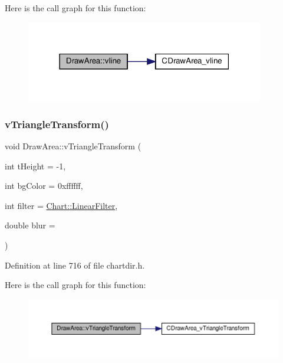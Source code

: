 Here is the call graph for this function\+:
\nopagebreak
\begin{figure}[H]
\begin{center}
\leavevmode
\includegraphics[width=295pt]{class_draw_area_ac679f2b836e67e68994b7977d4881383_cgraph}
\end{center}
\end{figure}
\mbox{\label{class_draw_area_a2de5a0565d3611d6730a70cfe0f2718f}} 
\subsubsection{\texorpdfstring{v\+Triangle\+Transform()}{vTriangleTransform()}}
{\footnotesize\ttfamily void Draw\+Area\+::v\+Triangle\+Transform (\begin{DoxyParamCaption}\item[{int}]{t\+Height = {\ttfamily -\/1},  }\item[{int}]{bg\+Color = {\ttfamily 0xffffff},  }\item[{int}]{filter = {\ttfamily \hyperlink{namespace_chart_ab75b9aa1781d0e0159ef1d441b577764a8cd729b7a982bac2dce8b021511e3ac6}{Chart\+::\+Linear\+Filter}},  }\item[{double}]{blur = {} }\end{DoxyParamCaption})\hspace{0.3cm}{\ttfamily [inline]}}



Definition at line 716 of file chartdir.\+h.

Here is the call graph for this function\+:
\nopagebreak
\begin{figure}[H]
\begin{center}
\leavevmode
\includegraphics[width=350pt]{class_draw_area_a2de5a0565d3611d6730a70cfe0f2718f_cgraph}
\end{center}
\end{figure}
\mbox{\label{class_draw_area_aa5f8289cb7562641389d28b799ff441e}} 
